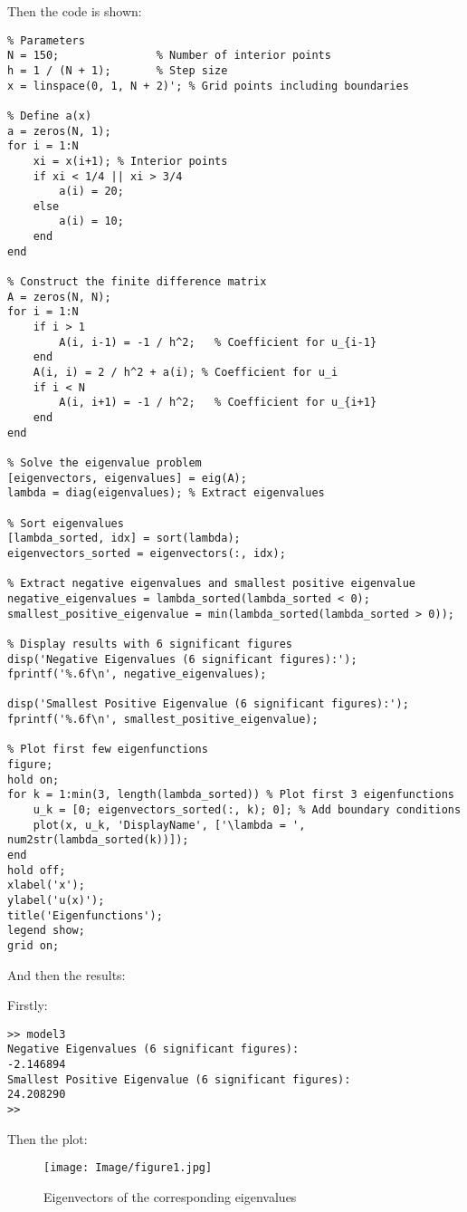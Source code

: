 Then the code is shown:
\label{Code}
\begin{verbatim}
% Parameters
N = 150;               % Number of interior points
h = 1 / (N + 1);       % Step size
x = linspace(0, 1, N + 2)'; % Grid points including boundaries

% Define a(x)
a = zeros(N, 1);
for i = 1:N
    xi = x(i+1); % Interior points
    if xi < 1/4 || xi > 3/4
        a(i) = 20;
    else
        a(i) = 10;
    end
end

% Construct the finite difference matrix
A = zeros(N, N);
for i = 1:N
    if i > 1
        A(i, i-1) = -1 / h^2;   % Coefficient for u_{i-1}
    end
    A(i, i) = 2 / h^2 + a(i); % Coefficient for u_i
    if i < N
        A(i, i+1) = -1 / h^2;   % Coefficient for u_{i+1}
    end
end

% Solve the eigenvalue problem
[eigenvectors, eigenvalues] = eig(A);
lambda = diag(eigenvalues); % Extract eigenvalues

% Sort eigenvalues
[lambda_sorted, idx] = sort(lambda);
eigenvectors_sorted = eigenvectors(:, idx);

% Extract negative eigenvalues and smallest positive eigenvalue
negative_eigenvalues = lambda_sorted(lambda_sorted < 0);
smallest_positive_eigenvalue = min(lambda_sorted(lambda_sorted > 0));

% Display results with 6 significant figures
disp('Negative Eigenvalues (6 significant figures):');
fprintf('%.6f\n', negative_eigenvalues);

disp('Smallest Positive Eigenvalue (6 significant figures):');
fprintf('%.6f\n', smallest_positive_eigenvalue);

% Plot first few eigenfunctions
figure;
hold on;
for k = 1:min(3, length(lambda_sorted)) % Plot first 3 eigenfunctions
    u_k = [0; eigenvectors_sorted(:, k); 0]; % Add boundary conditions
    plot(x, u_k, 'DisplayName', ['\lambda = ', num2str(lambda_sorted(k))]);
end
hold off;
xlabel('x');
ylabel('u(x)');
title('Eigenfunctions');
legend show;
grid on;
\end{verbatim}
And then the results:

Firstly:
\begin{verbatim}
>> model3
Negative Eigenvalues (6 significant figures):
-2.146894
Smallest Positive Eigenvalue (6 significant figures):
24.208290
>> 
\end{verbatim}
Then the plot:
\begin{figure}
    \centering
    \label{Figure 1}
    \texttt{[image: Image/figure1.jpg]}
    \caption[Eigenvectors of the corresponding eigenvalues]{Eigenvectors of the corresponding eigenvalues}
    \label{}
\end{figure}






